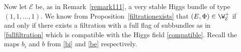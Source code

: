 \documentclass[12pt]{article}
\numberwithin{equation}{section}
\newtheorem{proposition}[theorem]{Proposition}
\theoremstyle{remark}
\theoremstyle{definition}
\numberwithin{theorem}{section}
\def\beq{\begin{eqnarray}}
\def\eeq{\end{eqnarray}}
\def\calE{{\mathcal E}}
\renewcommand{\1}{\mathbbm{1}}
\begin{document}




Now let $\calE$ be, as in Remark~\ref{remark111}, a very stable Higgs bundle of type $(1,1,\dots,1)$. We know from Proposition~\ref{filtrationexists} that $(E,\Phi)\in \W^+_{\calE}$ if and only if there exists a filtration with a full flag of subbundles as in \eqref{fullfiltration} which is compatible with the Higgs field \eqref{compatible}. Recall the maps $b_i$ and $b$ from \eqref{bi} and \eqref{be} respectively. 
\end{document}
